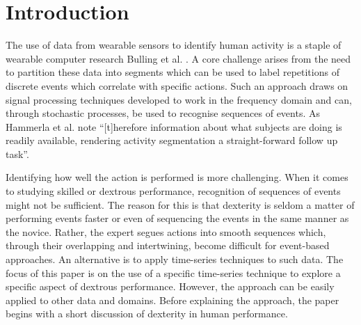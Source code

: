 \documentclass{sigchi}
\begin{document}






\section{Introduction}

The use of data from wearable sensors to identify human activity is a staple of wearable computer research 
Bulling et al. \cite{Bulling2014}. A core challenge arises from the need to partition these data into segments 
which can be used to label repetitions of discrete events which correlate with specific actions. 
Such an approach draws on signal processing techniques developed to work in the frequency domain and can, 
through stochastic processes, be used to recognise sequences of events.  As Hammerla et al. \cite{Hammerla2011}
note ``[t]herefore information about what subjects are doing is readily available, rendering activity 
segmentation a straight-forward follow up task''. 

Identifying how well the action is performed is more 
challenging. When it comes to studying skilled or dextrous performance, recognition of sequences of events 
might not be sufficient. The reason for this is that dexterity is seldom a matter of performing events 
faster or even of sequencing the events in the same manner as the novice. Rather, the expert segues actions 
into smooth sequences which, through their overlapping and intertwining, become difficult for event-based 
approaches. An alternative is to apply time-series techniques to such data. The focus of this paper is on 
the use of a specific time-series technique to explore a specific aspect of dextrous performance. 
However, the approach can be easily applied to other data and domains. Before explaining the approach, 
the paper begins with a short discussion of dexterity in human performance.
\end{document}
